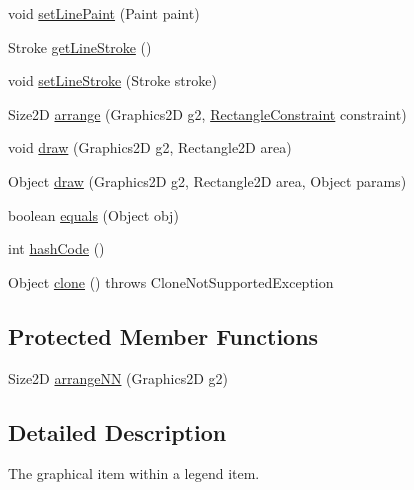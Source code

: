 \begin{DoxyCompactItemize}
\item 
void \mbox{\hyperlink{classorg_1_1jfree_1_1chart_1_1title_1_1_legend_graphic_ad8e6eae25621cbe61af6b006943d6d52}{set\+Line\+Paint}} (Paint paint)
\item 
Stroke \mbox{\hyperlink{classorg_1_1jfree_1_1chart_1_1title_1_1_legend_graphic_af9f4ca73029c94ecb41142b7299bbde0}{get\+Line\+Stroke}} ()
\item 
void \mbox{\hyperlink{classorg_1_1jfree_1_1chart_1_1title_1_1_legend_graphic_ab9a168a247bab74b0ca95c251d1ea9e7}{set\+Line\+Stroke}} (Stroke stroke)
\item 
Size2D \mbox{\hyperlink{classorg_1_1jfree_1_1chart_1_1title_1_1_legend_graphic_ae60f43bb510f5553a4ee11178030eb68}{arrange}} (Graphics2D g2, \mbox{\hyperlink{classorg_1_1jfree_1_1chart_1_1block_1_1_rectangle_constraint}{Rectangle\+Constraint}} constraint)
\item 
void \mbox{\hyperlink{classorg_1_1jfree_1_1chart_1_1title_1_1_legend_graphic_ad1fb830bbc828b5af54fa7b28909722a}{draw}} (Graphics2D g2, Rectangle2D area)
\item 
Object \mbox{\hyperlink{classorg_1_1jfree_1_1chart_1_1title_1_1_legend_graphic_ac29f7144d623700d566b65c515723bef}{draw}} (Graphics2D g2, Rectangle2D area, Object params)
\item 
boolean \mbox{\hyperlink{classorg_1_1jfree_1_1chart_1_1title_1_1_legend_graphic_a1e47a8ac3fef6219932a9792fa8cdc99}{equals}} (Object obj)
\item 
int \mbox{\hyperlink{classorg_1_1jfree_1_1chart_1_1title_1_1_legend_graphic_a3e1f7d04bbeb0e9348e90e94b50ce6b4}{hash\+Code}} ()
\item 
Object \mbox{\hyperlink{classorg_1_1jfree_1_1chart_1_1title_1_1_legend_graphic_acd53c74488e430e30cbca1021131a9f4}{clone}} ()  throws Clone\+Not\+Supported\+Exception 
\end{DoxyCompactItemize}
\subsection*{Protected Member Functions}
\begin{DoxyCompactItemize}
\item 
Size2D \mbox{\hyperlink{classorg_1_1jfree_1_1chart_1_1title_1_1_legend_graphic_aaf2f310fd939d84c1887c86d1ec9ff4b}{arrange\+NN}} (Graphics2D g2)
\end{DoxyCompactItemize}


\subsection{Detailed Description}
The graphical item within a legend item. 


